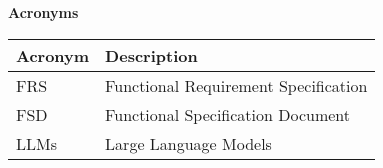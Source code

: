\textcolor{RFIGreen}{\Large\bf Acronyms}

\begin{center}

\begin{tabular}{|p{5cm}|p{9cm}|}
\hline
{\small\bf Acronym} & {\small\bf Description}\\
\hline

FRS & Functional Requirement Specification\\
FSD & Functional Specification Document\\
LLMs & Large Language Models\\

\hline

\end{tabular}

\end{center}

\newpage
